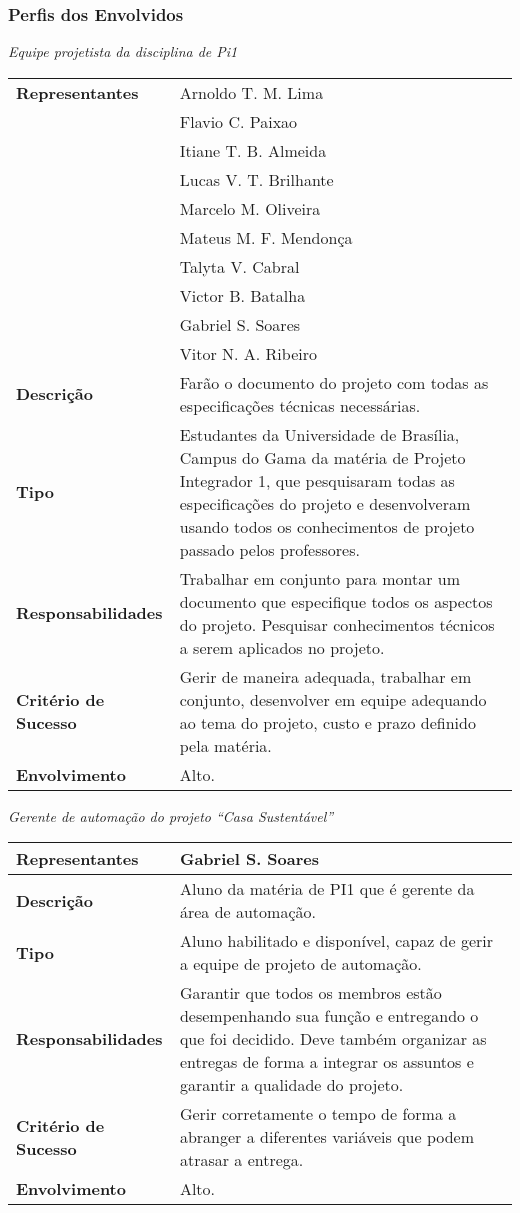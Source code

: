 \subsubsection{Perfis dos Envolvidos}

\textit{Equipe projetista da disciplina de Pi1}

\begin{longtable}{|m{5cm}|m{10cm}|}
	\hline \textbf{Representantes} & Arnoldo T. M. Lima\\ & Flavio C. Paixao\\ & Itiane T. B. Almeida\\ & Lucas V. T. Brilhante\\ & Marcelo M. Oliveira\\ & Mateus M. F. Mendon\c{c}a\\ & Talyta V. Cabral\\ & Victor B. Batalha\\ & Gabriel S. Soares\\ & Vitor N. A. Ribeiro\\
	\hline \textbf{Descrição} & Farão o documento do projeto com todas as especificações técnicas necessárias.\\
	\hline \textbf{Tipo} & Estudantes da Universidade de Brasília, Campus do Gama da matéria de Projeto Integrador 1, que pesquisaram todas as especificações do projeto e desenvolveram usando todos os conhecimentos de projeto passado pelos professores.\\
	\hline \textbf{Responsabilidades} & Trabalhar em conjunto para montar um documento que especifique todos os aspectos do projeto. Pesquisar conhecimentos técnicos a serem aplicados no projeto.\\
	\hline \textbf{Critério de Sucesso} & Gerir de maneira adequada, trabalhar em conjunto, desenvolver em equipe adequando ao tema do projeto, custo e prazo definido pela matéria.\\
	\hline \textbf{Envolvimento} & Alto.\\
	\hline
\end{longtable}

\textit{Gerente de automação do projeto “Casa Sustentável”}

\begin{longtable}{|m{5cm}|m{10cm}|}
	\hline \textbf{Representantes} & Gabriel S. Soares\\
	\hline \textbf{Descrição} & Aluno da matéria de PI1 que é gerente da área de automação.\\
	\hline \textbf{Tipo} & Aluno habilitado e disponível, capaz de gerir a equipe de projeto de automação.\\
	\hline \textbf{Responsabilidades} & Garantir que todos os membros estão desempenhando sua função e entregando o que foi decidido. Deve também organizar as entregas de forma a integrar os assuntos e garantir a qualidade do projeto.\\
	\hline \textbf{Critério de Sucesso} & Gerir corretamente o tempo de forma a abranger a diferentes variáveis que podem atrasar a entrega.\\
	\hline \textbf{Envolvimento} & Alto.\\
	\hline
\end{longtable}

